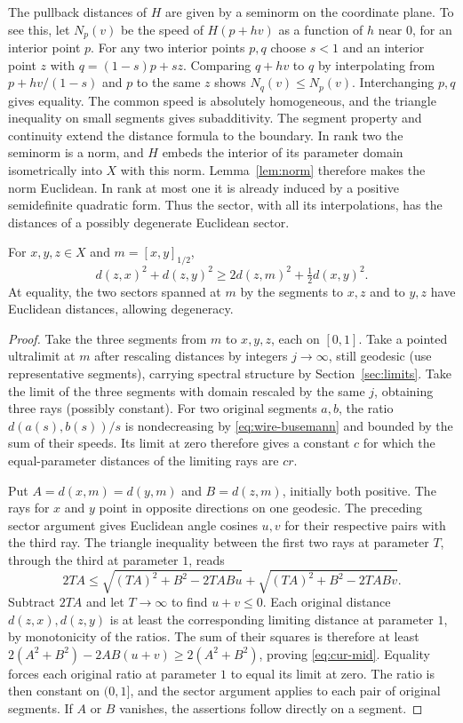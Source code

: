 The pullback distances of $H$ are given by a seminorm on the coordinate plane. To see this, let $N_p(v)$ be the speed of $H(p+hv)$ as a function of $h$ near $0$, for an interior point $p$. For any two interior points $p,q$ choose $s<1$ and an interior point $z$ with $q=(1-s)p+sz$. Comparing $q+hv$ to $q$ by interpolating from $p+hv/(1-s)$ and $p$ to the same $z$ shows $N_q(v)\le N_p(v)$. Interchanging $p,q$ gives equality. The common speed is absolutely homogeneous, and the triangle inequality on small segments gives subadditivity. The segment property and continuity extend the distance formula to the boundary. In rank two the seminorm is a norm, and $H$ embeds the interior of its parameter domain isometrically into $X$ with this norm. Lemma~\ref{lem:norm} therefore makes the norm Euclidean. In rank at most one it is already induced by a positive semidefinite quadratic form. Thus the sector, with all its interpolations, has the distances of a possibly degenerate Euclidean sector.

\begin{lemma}\label{lem:catzero}
For $x,y,z\in X$ and $m=[x,y]_{1/2}$,
\begin{equation}
 d(z,x)^2+d(z,y)^2\ge 2d(z,m)^2+\tfrac12 d(x,y)^2.
 \label{eq:cur-mid}
\end{equation}
At equality, the two sectors spanned at $m$ by the segments to $x,z$ and to $y,z$ have Euclidean distances, allowing degeneracy.
\end{lemma}

\begin{proof}
Take the three segments from $m$ to $x,y,z$, each on $[0,1]$. Take a pointed ultralimit at $m$ after rescaling distances by integers $j\to\infty$, still geodesic (use representative segments), carrying spectral structure by Section~\ref{sec:limits}. Take the limit of the three segments with domain rescaled by the same $j$, obtaining three rays (possibly constant). For two original segments $a,b$, the ratio $d(a(s),b(s))/s$ is nondecreasing by \eqref{eq:wire-busemann} and bounded by the sum of their speeds. Its limit at zero therefore gives a constant $c$ for which the equal-parameter distances of the limiting rays are $cr$.

Put $A=d(x,m)=d(y,m)$ and $B=d(z,m)$, initially both positive. The rays for $x$ and $y$ point in opposite directions on one geodesic. The preceding sector argument gives Euclidean angle cosines $u,v$ for their respective pairs with the third ray. The triangle inequality between the first two rays at parameter $T$, through the third at parameter $1$, reads
\[
 2TA\le\sqrt{(TA)^2+B^2-2TABu}+\sqrt{(TA)^2+B^2-2TABv}.
\]
Subtract $2TA$ and let $T\to\infty$ to find $u+v\le0$. Each original distance $d(z,x),d(z,y)$ is at least the corresponding limiting distance at parameter $1$, by monotonicity of the ratios. The sum of their squares is therefore at least $2(A^2+B^2)-2AB(u+v)\ge2(A^2+B^2)$, proving \eqref{eq:cur-mid}. Equality forces each original ratio at parameter $1$ to equal its limit at zero. The ratio is then constant on $(0,1]$, and the sector argument applies to each pair of original segments. If $A$ or $B$ vanishes, the assertions follow directly on a segment.
\end{proof}

